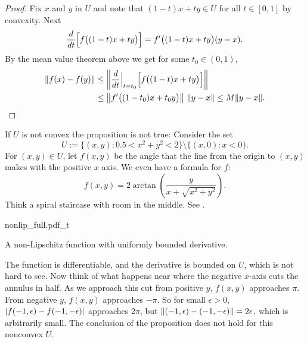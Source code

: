 \begin{proof}
Fix $x$ and $y$ in $U$ and note that
$(1-t)x+ty \in U$ for all $t \in [0,1]$
by convexity.
Next
\begin{equation*}
\frac{d}{dt} \Bigl[f\bigl((1-t)x+ty\bigr)\Bigr]
=
f'\bigl((1-t)x+ty\bigr) (y-x) .
\end{equation*}
By the mean value theorem above we get for
some $t_0 \in (0,1)$,
\begin{equation*}
\begin{split}
\lVert {f(x)-f(y)} \rVert & \leq
\left\lVert {\frac{d}{dt} \Big|_{t=t_0} \Bigl[ f\bigl((1-t)x+ty\bigr) \Bigr] } \right\rVert
\\
& \leq
\left\lVert {f'\bigl((1-t_0)x+t_0y\bigr)} \right\rVert \, \lVert {y-x} \rVert \leq
M \lVert {y-x} \rVert . \qedhere
\end{split}
\end{equation*}
\end{proof}

\begin{example}
If $U$ is not convex the proposition is not true: Consider
the set
\begin{equation*}
U := \bigl\{ (x,y) : 0.5 < x^2+y^2 < 2 \bigr\} \setminus \bigl\{ (x,0) : x <
0 \bigr\} .
\end{equation*}
For $(x,y) \in U$,
let $f(x,y)$ be the angle that the line from the origin to $(x,y)$
makes with the positive $x$ axis.  We even have a formula for $f$:
\begin{equation*}
f(x,y) = 2 \operatorname{arctan}\left( \frac{y}{x+\sqrt{x^2+y^2}}\right) .
\end{equation*}
Think a spiral staircase with room in the middle.  See
.

\begin{myfigureht}
{nonlip_full.pdf_t}
\caption{A non-Lipschitz function with uniformly bounded
derivative.\label{mv:fignonlip}}
\end{myfigureht}

The function is differentiable,
and the derivative is bounded on $U$, which is not hard to see.   Now
think of
what happens near where the negative $x$-axis cuts the annulus in half.
As we approach this cut from positive $y$, $f(x,y)$ approaches $\pi$.
From negative $y$, $f(x,y)$ approaches $-\pi$.
So for small $\epsilon > 0$, $\lvert {f(-1,\epsilon)-f(-1,-\epsilon)} \rvert$
approaches $2\pi$, but $\lVert {(-1,\epsilon)-(-1,-\epsilon)} \rVert = 2\epsilon$,
which is arbitrarily small.  The conclusion of the proposition does not
hold for this nonconvex $U$.
\end{example}

